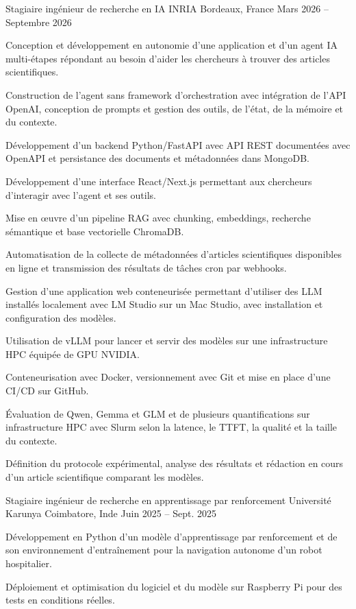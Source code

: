 
\begin{cventries}
  \cventry
    {Stagiaire ingénieur de recherche en IA}
    {INRIA}
    {Bordeaux, France}
    {Mars 2026 -- Septembre 2026}
    {
      \begin{cvitems}
        \item {Conception et développement en autonomie d’une application et d’un agent IA multi-étapes répondant au besoin d’aider les chercheurs à trouver des articles scientifiques.}
        \item {Construction de l’agent sans framework d’orchestration avec intégration de l’API OpenAI, conception de prompts et gestion des outils, de l’état, de la mémoire et du contexte.}
        \item {Développement d’un backend Python/FastAPI avec API REST documentées avec OpenAPI et persistance des documents et métadonnées dans MongoDB.}
        \item {Développement d’une interface React/Next.js permettant aux chercheurs d’interagir avec l’agent et ses outils.}
        \item {Mise en œuvre d’un pipeline RAG avec chunking, embeddings, recherche sémantique et base vectorielle ChromaDB.}
        \item {Automatisation de la collecte de métadonnées d’articles scientifiques disponibles en ligne et transmission des résultats de tâches cron par webhooks.}
        \item {Gestion d’une application web conteneurisée permettant d’utiliser des LLM installés localement avec LM Studio sur un Mac Studio, avec installation et configuration des modèles.}
        \item {Utilisation de vLLM pour lancer et servir des modèles sur une infrastructure HPC équipée de GPU NVIDIA.}
        \item {Conteneurisation avec Docker, versionnement avec Git et mise en place d’une CI/CD sur GitHub.}
        \item {Évaluation de Qwen, Gemma et GLM et de plusieurs quantifications sur infrastructure HPC avec Slurm selon la latence, le TTFT, la qualité et la taille du contexte.}
        \item {Définition du protocole expérimental, analyse des résultats et rédaction en cours d’un article scientifique comparant les modèles.}
      \end{cvitems}
    }

  \cventry
    {Stagiaire ingénieur de recherche en apprentissage par renforcement}
    {Université Karunya}
    {Coimbatore, Inde}
    {Juin 2025 -- Sept. 2025}
    {
      \begin{cvitems}
        \item {Développement en Python d’un modèle d’apprentissage par renforcement et de son environnement d’entraînement pour la navigation autonome d’un robot hospitalier.}
        \item {Déploiement et optimisation du logiciel et du modèle sur Raspberry Pi pour des tests en conditions réelles.}
      \end{cvitems}
    }
\end{cventries}
